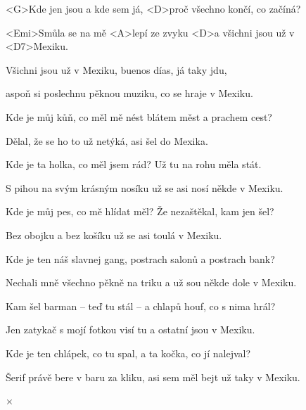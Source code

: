 

\zs
<G>Kde jen jsou a kde sem já, <D>proč všechno končí, co začíná?

<Emi>Smůla se na mě <A>lepí ze zvyku <D>a všichni jsou už 
v <D7>Mexiku.
\ks

\zr
Všichni jsou už v Mexiku, buenos días, já taky jdu,

aspoň si poslechnu pěknou muziku, co se hraje v Mexiku.
\kr

\zs
Kde je můj kůň, co měl mě nést blátem měst a prachem cest?

Dělal, že se ho to už netýká, asi šel do Mexika.
\ks

\zs
Kde je ta holka, co měl jsem rád? Už tu na rohu měla stát.

S pihou na svým krásným nosíku už se asi nosí někde v Mexiku.
\ks

\zr
\kr

\zs
Kde je můj pes, co mě hlídat měl? Že nezaštěkal, kam jen šel?

Bez obojku a bez košíku už se asi toulá v Mexiku.
\ks

\zs
Kde je ten náš slavnej gang, postrach salonů a postrach bank?

Nechali mně všechno pěkně na triku a už sou někde dole v Mexiku.
\ks

\zr
\kr

\zs
Kam šel barman -- teď tu stál -- a chlapů houf, co s nima hrál?

Jen zatykač s mojí fotkou visí tu a ostatní jsou v Mexiku.
\ks

\zs
Kde je ten chlápek, co tu spal, a ta kočka, co jí nalejval?

Šerif právě bere v baru za kliku, asi sem měl bejt už taky v Mexiku.
\ks

×\kr

\kp
